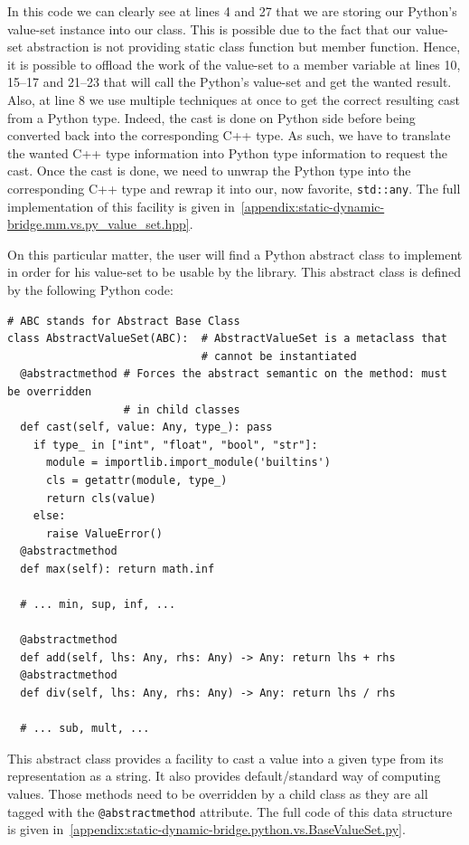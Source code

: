 In this code we can clearly see at lines 4 and 27 that we are storing our Python's value-set instance into our class.
This is possible due to the fact that our value-set abstraction is not providing static class function but member
function. Hence, it is possible to offload the work of the value-set to a member variable at lines 10, 15--17 and 21--23
that will call the Python's value-set and get the wanted result. Also, at line 8 we use multiple techniques at once to
get the correct resulting cast from a Python type. Indeed, the cast is done on Python side before being converted back
into the corresponding C++ type. As such, we have to translate the wanted C++ type information into Python type
information to request the cast. Once the cast is done, we need to unwrap the Python type into the corresponding C++
type and rewrap it into our, now favorite, \texttt{std::any}. The full implementation of this facility is given
in~\cref{appendix:static-dynamic-bridge.mm.vs.py_value_set.hpp}.

On this particular matter, the user will find a Python abstract class to implement in order for his value-set to be
usable by the library. This abstract class is defined by the following Python code:

\begin{verbatim}
# ABC stands for Abstract Base Class
class AbstractValueSet(ABC):  # AbstractValueSet is a metaclass that
                              # cannot be instantiated
  @abstractmethod # Forces the abstract semantic on the method: must be overridden
                  # in child classes
  def cast(self, value: Any, type_): pass
    if type_ in ["int", "float", "bool", "str"]:
      module = importlib.import_module('builtins')
      cls = getattr(module, type_)
      return cls(value)
    else:
      raise ValueError()
  @abstractmethod
  def max(self): return math.inf

  # ... min, sup, inf, ...

  @abstractmethod
  def add(self, lhs: Any, rhs: Any) -> Any: return lhs + rhs
  @abstractmethod
  def div(self, lhs: Any, rhs: Any) -> Any: return lhs / rhs

  # ... sub, mult, ...
\end{verbatim}

This abstract class provides a facility to cast a value into a given type from its representation as a string. It also
provides default/standard way of computing values. Those methods need to be overridden by a child class as they are all
tagged with the \texttt{@abstractmethod} attribute. The full code of this data structure is given
in~\cref{appendix:static-dynamic-bridge.python.vs.BaseValueSet.py}.

